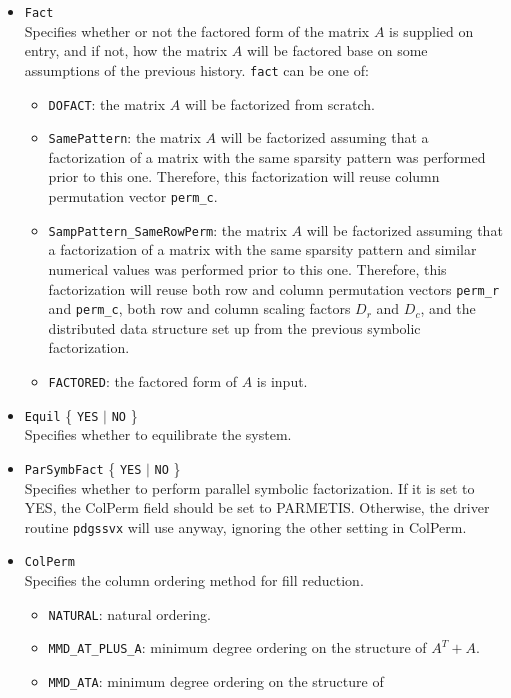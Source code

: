 \begin{itemize}
\item {\tt Fact}\\
    Specifies whether or not the factored form of the matrix
    $A$ is supplied on entry, and if not, how the matrix $A$ will
    be factored base on some assumptions of the previous history.
    {\tt fact} can be one of:
    \begin{itemize}
    \item {\tt DOFACT}: the matrix $A$ will be factorized from scratch.
    \item {\tt SamePattern}: the matrix $A$ will be factorized assuming
	that a factorization of a matrix with the same sparsity pattern
	was performed prior to this one. Therefore, this factorization
        will reuse column permutation vector {\tt perm\_c}.
    \item {\tt SampPattern\_SameRowPerm}: the matrix $A$ will be factorized
	assuming that a factorization of a matrix with the same sparsity
	pattern and similar numerical values was performed prior to this one.
        Therefore, this factorization will reuse both row and column
        permutation vectors {\tt perm\_r} and {\tt perm\_c}, both row and
	column scaling factors $D_r$ and $D_c$, and the distributed data
	structure set up from the previous symbolic factorization.
    \item {\tt FACTORED}: the factored form of $A$ is input.
    \end{itemize}
\item {\tt Equil}  \{ {\tt YES} $|$ {\tt NO} \} \\
    Specifies whether to equilibrate the system.
\item {\tt ParSymbFact}   \{ {\tt YES} $|$ {\tt NO} \} \\ 
    Specifies whether to perform parallel symbolic factorization.
    If it is set to \textsf{YES}, the \textsf{ColPerm} field should
    be set to \textsf{PARMETIS}. Otherwise, the driver routine {\tt pdgssvx}
    will use {\parmetis} anyway, ignoring the other setting in
    \textsf{ColPerm}.
\item {\tt ColPerm}\\
    Specifies the column ordering method for fill reduction.
    \begin{itemize}
    \item {\tt NATURAL}: natural ordering.
    \item {\tt MMD\_AT\_PLUS\_A}: minimum degree ordering on the
			structure of $A^T+A$.
    \item {\tt MMD\_ATA}: minimum degree ordering on the structure of

\end{itemize}
\end{itemize}
